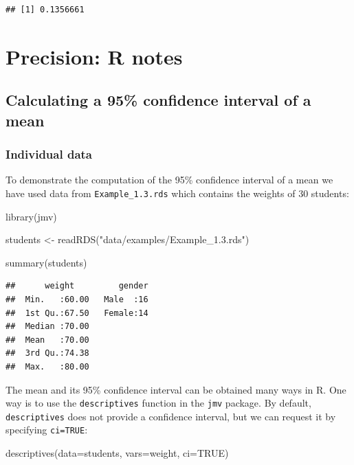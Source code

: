 \documentclass[
]{memoir}
\newenvironment{Shaded}{\begin{snugshade}}{\end{snugshade}}
\newcommand{\AttributeTok}[1]{\textcolor[rgb]{0.77,0.63,0.00}{#1}}
\newcommand{\ConstantTok}[1]{\textcolor[rgb]{0.00,0.00,0.00}{#1}}
\newcommand{\FunctionTok}[1]{\textcolor[rgb]{0.00,0.00,0.00}{#1}}
\newcommand{\NormalTok}[1]{#1}
\newcommand{\OtherTok}[1]{\textcolor[rgb]{0.56,0.35,0.01}{#1}}
\newcommand{\StringTok}[1]{\textcolor[rgb]{0.31,0.60,0.02}{#1}}
\begin{document}
\begin{verbatim}
## [1] 0.1356661
\end{verbatim}

\hypertarget{precision-r-notes}{%
\chapter{Precision: R notes}\label{precision-r-notes}}

\hypertarget{calculating-a-95-confidence-interval-of-a-mean}{%
\section{Calculating a 95\% confidence interval of a mean}\label{calculating-a-95-confidence-interval-of-a-mean}}

\hypertarget{individual-data}{%
\subsection{Individual data}\label{individual-data}}

To demonstrate the computation of the 95\% confidence interval of a mean we have used data from \texttt{Example\_1.3.rds} which contains the weights of 30 students:

\begin{Shaded}
\begin{Highlighting}[]
\FunctionTok{library}\NormalTok{(jmv)}

\NormalTok{students }\OtherTok{\textless{}{-}} \FunctionTok{readRDS}\NormalTok{(}\StringTok{"data/examples/Example\_1.3.rds"}\NormalTok{)}

\FunctionTok{summary}\NormalTok{(students)}
\end{Highlighting}
\end{Shaded}

\begin{verbatim}
##      weight         gender  
##  Min.   :60.00   Male  :16  
##  1st Qu.:67.50   Female:14  
##  Median :70.00              
##  Mean   :70.00              
##  3rd Qu.:74.38              
##  Max.   :80.00
\end{verbatim}

The mean and its 95\% confidence interval can be obtained many ways in R. One way is to use the \texttt{descriptives} function in the \texttt{jmv} package. By default, \texttt{descriptives} does not provide a confidence interval, but we can request it by specifying \texttt{ci=TRUE}:

\begin{Shaded}
\begin{Highlighting}[]
\FunctionTok{descriptives}\NormalTok{(}\AttributeTok{data=}\NormalTok{students, }\AttributeTok{vars=}\NormalTok{weight, }\AttributeTok{ci=}\ConstantTok{TRUE}\NormalTok{)}
\end{Highlighting}
\end{Shaded}
\end{document}
